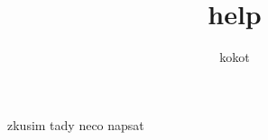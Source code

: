 \documentclass{article}
\title{help}
\author{kokot}
\date{}
\begin{document}
zkusim tady neco napsat
\end{document}
